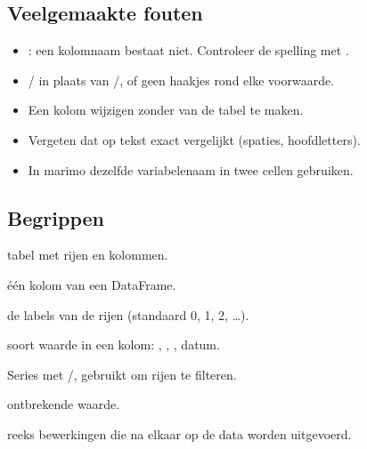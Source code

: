 \documentclass[11pt,a4paper]{article}
\begin{document}
\subsection*{Veelgemaakte fouten}

\begin{itemize}
  \item {}: een kolomnaam bestaat niet. Controleer de
        spelling met .
  \item {}/ in plaats van \code{\&}/\code{|}, of geen
        haakjes rond elke voorwaarde.
  \item Een kolom wijzigen zonder  van de tabel te maken.
  \item Vergeten dat \code{==} op tekst exact vergelijkt (spaties,
        hoofdletters).
  \item In marimo dezelfde variabelenaam in twee cellen gebruiken.
\end{itemize}

\subsection*{Begrippen}

\begin{description}[leftmargin=2.6cm, labelwidth=2.4cm, font=\normalfont\bfseries]
  \item[DataFrame] tabel met rijen en kolommen.
  \item[Series] één kolom van een DataFrame.
  \item[index] de labels van de rijen (standaard 0, 1, 2, \dots).
  \item[datatype] soort waarde in een kolom: , , , datum.
  \item[masker] Series met /, gebruikt om rijen te filteren.
  \item[NaN] ontbrekende waarde.
  \item[pipeline] reeks bewerkingen die na elkaar op de data worden uitgevoerd.
\end{description}
\end{document}
